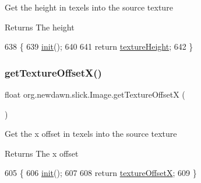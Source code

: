 Get the height in texels into the source texture

\begin{DoxyReturn}{Returns}
The height 
\end{DoxyReturn}

\begin{DoxyCode}
638                                     \{
639         \mbox{\hyperlink{classorg_1_1newdawn_1_1slick_1_1_image_a94d180c9218ba1444a0496a1898ec345}{init}}();
640         
641         \textcolor{keywordflow}{return} \mbox{\hyperlink{classorg_1_1newdawn_1_1slick_1_1_image_a048cc714a1282eac215dbe4e722a3146}{textureHeight}};
642     \}
\end{DoxyCode}
\mbox{\label{classorg_1_1newdawn_1_1slick_1_1_image_a1d7789c307a9d99268d4888e91124b59}} 
\subsubsection{\texorpdfstring{get\+Texture\+Offset\+X()}{getTextureOffsetX()}}
{\footnotesize\ttfamily float org.\+newdawn.\+slick.\+Image.\+get\+Texture\+OffsetX (\begin{DoxyParamCaption}{ }\end{DoxyParamCaption})\hspace{0.3cm}{\ttfamily [inline]}}

Get the x offset in texels into the source texture

\begin{DoxyReturn}{Returns}
The x offset 
\end{DoxyReturn}

\begin{DoxyCode}
605                                      \{
606         \mbox{\hyperlink{classorg_1_1newdawn_1_1slick_1_1_image_a94d180c9218ba1444a0496a1898ec345}{init}}();
607         
608         \textcolor{keywordflow}{return} \mbox{\hyperlink{classorg_1_1newdawn_1_1slick_1_1_image_a0d11936067f8ad706c42a5feb411b5c8}{textureOffsetX}};
609     \}
\end{DoxyCode}
\mbox{\label{classorg_1_1newdawn_1_1slick_1_1_image_a5fd5e077fd5bec9ee51afd995110fa37}} 
